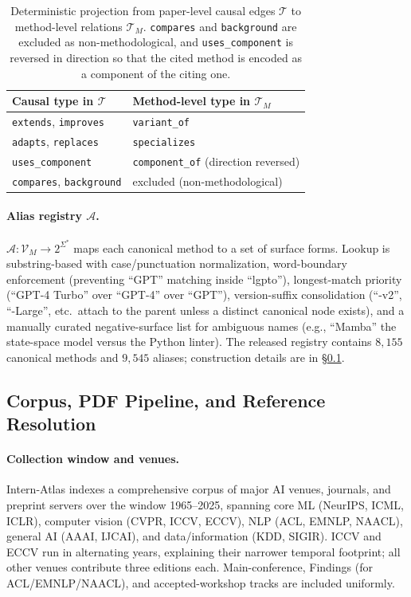 \documentclass{opendatalab}
\begin{document}
\begin{table}[h]
\centering
\caption{Deterministic projection from paper-level causal edges $\mathcal{T}$ to method-level relations
$\mathcal{T}_M$. \texttt{compares} and \texttt{background} are excluded as non-methodological, and
\texttt{uses\_component} is reversed in direction so that the cited method is encoded as a component of the citing
one.}
\label{tab:projection}
\begin{tabularx}{\linewidth}{l X}
\toprule
Causal type in $\mathcal{T}$ & Method-level type in $\mathcal{T}_M$ \\
\midrule
\texttt{extends}, \texttt{improves} & \texttt{variant\_of} \\
\texttt{adapts}, \texttt{replaces} & \texttt{specializes} \\
\texttt{uses\_component} & \texttt{component\_of} (direction reversed) \\
\texttt{compares}, \texttt{background} & excluded (non-methodological) \\
\bottomrule
\end{tabularx}
\end{table}

\paragraph{Alias registry $\mathcal{A}$.}
$\mathcal{A}:\mathcal{V}_M\to 2^{\Sigma^\ast}$ maps each canonical method to a set of surface forms. Lookup is
substring-based with case/punctuation normalization, word-boundary enforcement (preventing ``GPT'' matching inside
``lgpto''), longest-match priority (``GPT-4 Turbo'' over ``GPT-4'' over ``GPT''), version-suffix consolidation
(``-v2'', ``-Large'', etc.\ attach to the parent unless a distinct canonical node exists), and a manually curated
negative-surface list for ambiguous names (e.g., ``Mamba'' the state-space model versus the Python linter). The released registry contains $8,155$ canonical methods and $9,545$ aliases; construction details are in
\S\ref{app:corpus}.


\subsection{Corpus, PDF Pipeline, and Reference Resolution}
\label{app:corpus}

\paragraph{Collection window and venues.}
Intern-Atlas indexes a comprehensive corpus of major AI venues, journals, and preprint servers over the window 1965--2025, spanning core ML (NeurIPS, ICML, ICLR), computer vision (CVPR, ICCV, ECCV), NLP (ACL, EMNLP, NAACL), general AI (AAAI, IJCAI), and data/information (KDD, SIGIR). ICCV and ECCV run in alternating years, explaining their narrower temporal footprint; all other venues contribute three editions each. Main-conference, Findings (for ACL/EMNLP/NAACL), and accepted-workshop tracks are included uniformly.
\end{document}
